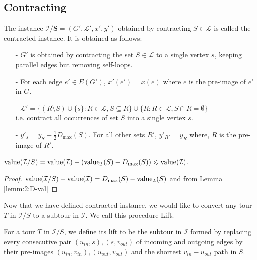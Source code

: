 \documentclass[./main.tex]{subfiles}
\newcommand{\calI}{\ensuremath{\mathcal{I}}}
\newcommand{\calL}{\ensuremath{\mathcal{L}}}
\begin{document}
	\subsection{Contracting}
	\begin{definition}
		The instance $\bm{\calI/S} = (G', \calL', x', y')$ obtained by contracting $S\in \calL$ is called the contracted instance. It is obtained as follows:
		\begin{itemize}
			\item[-] $G'$ is obtained by contracting the set $S \in \calL$ to a single vertex $s$, keeping parallel edges but removing self-loops.
			\item[-] For each edge $e' \in E(G')$, $x'(e') = x(e)$ where $e$ is the pre-image of $e'$ in $G$.
			\item[-] $\calL' = \{(R\setminus S) \cup \{s\} : R\in \calL, S \subseteq R\} 
			\cup
			\{R: R\in \calL, S \cap R = \emptyset\}$
			\\i.e. contract all occurrences of set $S$ into a single vertex $s$.
			\item[-] $y'_s = y_S + \frac{1}{2}D_{\max}(S)$. For all other sets $R'$, $y'_{R'} = y_R$ where, $R$ is the pre-image of $R'$.
		\end{itemize}
	\end{definition}\vspace{2mm}
	\begin{fact}\label{fact:3:val-c}
		$\val(\calI/S) = \val(\calI) - (\val_\calI(S) - D_{\max}(S)) \leqslant \val(\calI)$.
	\end{fact}
	\begin{proof}
		$\val(\calI/S) - \val(\calI) = D_{\max}(S) - \val_\calI(S)$ and from \hyperref[lemm:2:D-val]{Lemma \ref{lemm:2:D-val}}
	\end{proof}
	
	Now that we have defined contracted instance, we would like to convert any tour $T$ in $\calI/S$ to a subtour in $\calI$. We call this procedure Lift.
	
	\begin{definition}
		For a tour $T$ in $\calI/S$, we define its lift to be the subtour in $\calI$ formed by replacing every consecutive pair $(u_{in}, s), (s, v_{out})$ of incoming and outgoing edges by their pre-images $(u_{in}, v_{in}), (u_{out}, v_{out})$ and the shortest $v_{in} - u_{out}$ path in $S$.
	\end{definition}\vspace{2mm}
	
\end{document}
